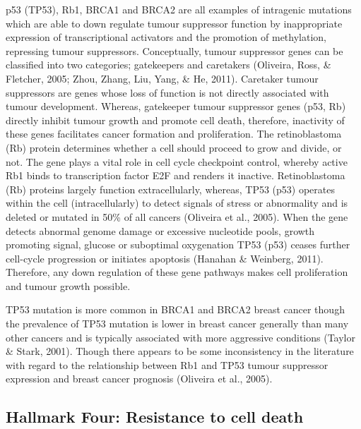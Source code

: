 \documentclass[a4paper, twoside]{templates/ociamthesis}
\begin{document}
p53 (TP53), Rb1, BRCA1 and BRCA2 are all examples of intragenic mutations which are able to down regulate tumour suppressor function by inappropriate expression of transcriptional activators and the promotion of methylation, repressing tumour suppressors. Conceptually, tumour suppressor genes can be classified into two categories; gatekeepers and caretakers (Oliveira, Ross, \& Fletcher, 2005; Zhou, Zhang, Liu, Yang, \& He, 2011). Caretaker tumour suppressors are genes whose loss of function is not directly associated with tumour development. Whereas, gatekeeper tumour suppressor genes (p53, Rb) directly inhibit tumour growth and promote cell death, therefore, inactivity of these genes facilitates cancer formation and proliferation.
The retinoblastoma (Rb) protein determines whether a cell should proceed to grow and divide, or not. The gene plays a vital role in cell cycle checkpoint control, whereby active Rb1 binds to transcription factor E2F and renders it inactive. Retinoblastoma (Rb) proteins largely function extracellularly, whereas, TP53 (p53) operates within the cell (intracellularly) to detect signals of stress or abnormality and is deleted or mutated in 50\% of all cancers (Oliveira et al., 2005). When the gene detects abnormal genome damage or excessive nucleotide pools, growth promoting signal, glucose or suboptimal oxygenation TP53 (p53) ceases further cell-cycle progression or initiates apoptosis (Hanahan \& Weinberg, 2011). Therefore, any down regulation of these gene pathways makes cell proliferation and tumour growth possible.

TP53 mutation is more common in BRCA1 and BRCA2 breast cancer though the prevalence of TP53 mutation is lower in breast cancer generally than many other cancers and is typically associated with more aggressive conditions (Taylor \& Stark, 2001). Though there appears to be some inconsistency in the literature with regard to the relationship between Rb1 and TP53 tumour suppressor expression and breast cancer prognosis (Oliveira et al., 2005).

\hypertarget{hallmark-four-resistance-to-cell-death}{%
\subsection{Hallmark Four: Resistance to cell death}\label{hallmark-four-resistance-to-cell-death}}
\end{document}
